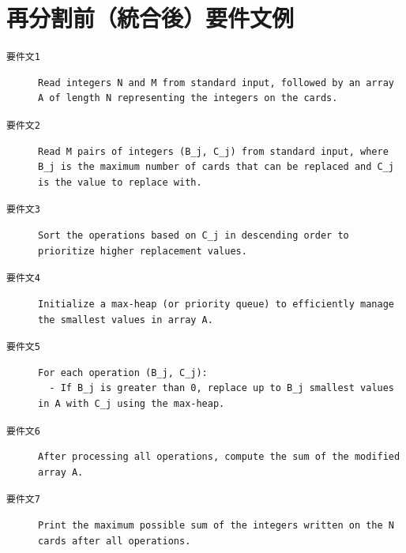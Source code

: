 \documentclass[11pt]{jreport}
\begin{document}
\section{再分割前（統合後）要件文例}
\label{req_before_split}
\begin{description}
  \item[\texttt{要件文1}]\par\noindent
\begin{Verbatim}[breaklines=true,breakanywhere=true]
Read integers N and M from standard input, followed by an array A of length N representing the integers on the cards.
\end{Verbatim}

  \item[\texttt{要件文2}]\par\noindent
\begin{Verbatim}[breaklines=true,breakanywhere=true]
Read M pairs of integers (B_j, C_j) from standard input, where B_j is the maximum number of cards that can be replaced and C_j is the value to replace with.
\end{Verbatim}

  \item[\texttt{要件文3}]\par\noindent
\begin{Verbatim}[breaklines=true,breakanywhere=true]
Sort the operations based on C_j in descending order to prioritize higher replacement values.
\end{Verbatim}

  \item[\texttt{要件文4}]\par\noindent
\begin{Verbatim}[breaklines=true,breakanywhere=true]
Initialize a max-heap (or priority queue) to efficiently manage the smallest values in array A.
\end{Verbatim}

  \item[\texttt{要件文5}]\par\noindent
\begin{Verbatim}[breaklines=true,breakanywhere=true]
For each operation (B_j, C_j):
  - If B_j is greater than 0, replace up to B_j smallest values in A with C_j using the max-heap.
\end{Verbatim}

  \item[\texttt{要件文6}]\par\noindent
\begin{Verbatim}[breaklines=true,breakanywhere=true]
After processing all operations, compute the sum of the modified array A.
\end{Verbatim}

  \item[\texttt{要件文7}]\par\noindent
\begin{Verbatim}[breaklines=true,breakanywhere=true]
Print the maximum possible sum of the integers written on the N cards after all operations.
\end{Verbatim}
\end{description}
\end{document}

